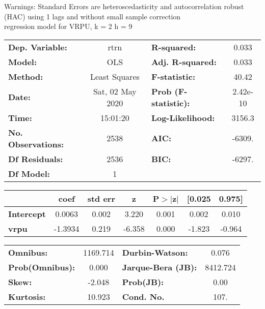 Warnings: \newline
 [1] Standard Errors are heteroscedasticity and autocorrelation robust (HAC) using 1 lags and without small sample correction\\ 

regression model for VRPU, k = 2 h = 9\begin{center}
\begin{tabular}{lclc}
\toprule
\textbf{Dep. Variable:}    &       rtrn       & \textbf{  R-squared:         } &     0.033   \\
\textbf{Model:}            &       OLS        & \textbf{  Adj. R-squared:    } &     0.033   \\
\textbf{Method:}           &  Least Squares   & \textbf{  F-statistic:       } &     40.42   \\
\textbf{Date:}             & Sat, 02 May 2020 & \textbf{  Prob (F-statistic):} &  2.42e-10   \\
\textbf{Time:}             &     15:01:20     & \textbf{  Log-Likelihood:    } &    3156.3   \\
\textbf{No. Observations:} &        2538      & \textbf{  AIC:               } &    -6309.   \\
\textbf{Df Residuals:}     &        2536      & \textbf{  BIC:               } &    -6297.   \\
\textbf{Df Model:}         &           1      & \textbf{                     } &             \\
\bottomrule
\end{tabular}
\begin{tabular}{lcccccc}
                   & \textbf{coef} & \textbf{std err} & \textbf{z} & \textbf{P$> |$z$|$} & \textbf{[0.025} & \textbf{0.975]}  \\
\midrule
\textbf{Intercept} &       0.0063  &        0.002     &     3.220  &         0.001        &        0.002    &        0.010     \\
\textbf{vrpu}      &      -1.3934  &        0.219     &    -6.358  &         0.000        &       -1.823    &       -0.964     \\
\bottomrule
\end{tabular}
\begin{tabular}{lclc}
\textbf{Omnibus:}       & 1169.714 & \textbf{  Durbin-Watson:     } &    0.076  \\
\textbf{Prob(Omnibus):} &   0.000  & \textbf{  Jarque-Bera (JB):  } & 8412.724  \\
\textbf{Skew:}          &  -2.048  & \textbf{  Prob(JB):          } &     0.00  \\
\textbf{Kurtosis:}      &  10.923  & \textbf{  Cond. No.          } &     107.  \\
\bottomrule
\end{tabular}
\end{center}

